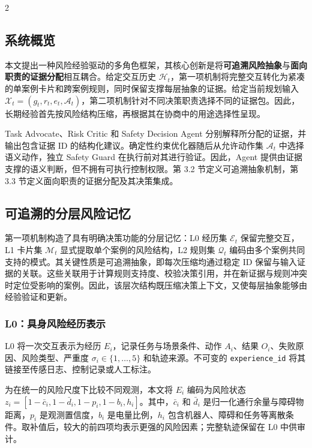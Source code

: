 \documentclass[10pt]{article}
\newcommand{\code}[1]{\texttt{#1}}
\begin{document}
\begin{multicols}{2}
\raggedcolumns

\subsection{系统概览}

本文提出一种风险经验驱动的多角色框架，其核心创新是将\textbf{可追溯风险抽象}与\textbf{面向职责的证据分配}相互耦合。给定交互历史 $\mathcal{H}_t$，第一项机制将完整交互转化为紧凑的单案例卡片和跨案例规则，同时保留支撑每层抽象的证据。给定当前规划输入 $\mathcal{X}_t=(g_t,r_t,e_t,\mathcal{A}_t)$，第二项机制针对不同决策职责选择不同的证据包。因此，长期经验首先按风险结构压缩，再根据其在协商中的用途选择性呈现。

Task Advocate、Risk Critic 和 Safety Decision Agent 分别解释所分配的证据，并输出包含证据 ID 的结构化建议。确定性约束优化器随后从允许动作集 $\mathcal{A}_t$ 中选择语义动作，独立 Safety Guard 在执行前对其进行验证。因此，Agent 提供由证据支撑的语义判断，但不拥有可执行控制权限。第 3.2 节定义可追溯抽象机制，第 3.3 节定义面向职责的证据分配及其决策集成。

\subsection{可追溯的分层风险记忆}

第一项机制构造了具有明确决策功能的分层记忆：L0 经历集 $\mathcal{E}_t$ 保留完整交互，L1 卡片集 $\mathcal{M}_t$ 显式提取单个案例的风险结构，L2 规则集 $\mathcal{Q}_t$ 编码由多个案例共同支持的模式。其关键性质是可追溯抽象，即每次压缩均通过稳定 ID 保留与输入证据的关联。这些关联用于计算规则支持度、校验决策引用，并在新证据与规则冲突时定位受影响的案例。因此，该层次结构既压缩决策上下文，又使每层抽象能够由经验验证和更新。

\subsubsection{L0：具身风险经历表示}

L0 将一次交互表示为经历 $E_i$，记录任务与场景条件、动作 $A_i$、结果 $O_i$、失败原因、风险类型、严重度 $\sigma_i\in\{1,\ldots,5\}$ 和轨迹来源。不可变的 \code{experience\_id} 将其链接至传感日志、控制记录或人工标注。

为在统一的风险尺度下比较不同观测，本文将 $E_i$ 编码为风险状态 $z_i=[1-\bar c_i,1-\bar d_i,1-p_i,1-b_i,h_i]$。其中，$\bar c_i$ 和 $\bar d_i$ 是归一化通行余量与障碍物距离，$p_i$ 是观测置信度，$b_i$ 是电量比例，$h_i$ 包含机器人、障碍和任务等离散条件。取补值后，较大的前四项均表示更强的风险因素；完整轨迹保留在 L0 中供审计。


\end{multicols}
\end{document}
